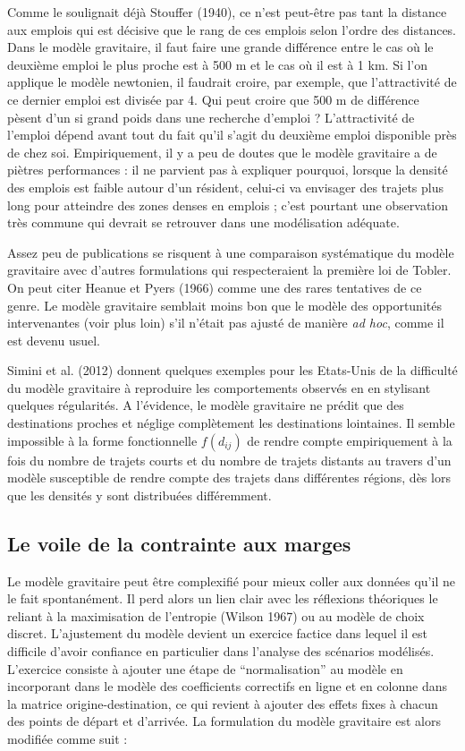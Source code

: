 \documentclass[
  10pt,
  a4paper,
  numbers=noendperiod,
  DIV=9]{scrreprt}
\begin{document}
Comme le soulignait déjà Stouffer (1940), ce n'est peut-être pas tant la
distance aux emplois qui est décisive que le rang de ces emplois selon
l'ordre des distances. Dans le modèle gravitaire, il faut faire une
grande différence entre le cas où le deuxième emploi le plus proche est
à 500 m et le cas où il est à 1 km. Si l'on applique le modèle
newtonien, il faudrait croire, par exemple, que l'attractivité de ce
dernier emploi est divisée par 4. Qui peut croire que 500 m de
différence pèsent d'un si grand poids dans une recherche d'emploi ?
L'attractivité de l'emploi dépend avant tout du fait qu'il s'agit du
deuxième emploi disponible près de chez soi. Empiriquement, il y a peu
de doutes que le modèle gravitaire a de piètres performances : il ne
parvient pas à expliquer pourquoi, lorsque la densité des emplois est
faible autour d'un résident, celui-ci va envisager des trajets plus long
pour atteindre des zones denses en emplois ; c'est pourtant une
observation très commune qui devrait se retrouver dans une modélisation
adéquate.

Assez peu de publications se risquent à une comparaison systématique du
modèle gravitaire avec d'autres formulations qui respecteraient la
première loi de Tobler. On peut citer Heanue et Pyers (1966) comme une
des rares tentatives de ce genre. Le modèle gravitaire semblait moins
bon que le modèle des opportunités intervenantes (voir plus loin) s'il
n'était pas ajusté de manière \emph{ad hoc}, comme il est devenu usuel.

Simini et al. (2012) donnent quelques exemples pour les Etats-Unis de la
difficulté du modèle gravitaire à reproduire les comportements observés
en en stylisant quelques régularités. A l'évidence, le modèle gravitaire
ne prédit que des destinations proches et néglige complètement les
destinations lointaines. Il semble impossible à la forme fonctionnelle
\(f(d_{ij})\) de rendre compte empiriquement à la fois du nombre de
trajets courts et du nombre de trajets distants au travers d'un modèle
susceptible de rendre compte des trajets dans différentes régions, dès
lors que les densités y sont distribuées différemment.

\hypertarget{le-voile-de-la-contrainte-aux-marges}{%
\subsection{Le voile de la contrainte aux
marges}\label{le-voile-de-la-contrainte-aux-marges}}

Le modèle gravitaire peut être complexifié pour mieux coller aux données
qu'il ne le fait spontanément. Il perd alors un lien clair avec les
réflexions théoriques le reliant à la maximisation de l'entropie (Wilson
1967) ou au modèle de choix discret. L'ajustement du modèle devient un
exercice factice dans lequel il est difficile d'avoir confiance en
particulier dans l'analyse des scénarios modélisés. L'exercice consiste
à ajouter une étape de ``normalisation'' au modèle en incorporant dans
le modèle des coefficients correctifs en ligne et en colonne dans la
matrice origine-destination, ce qui revient à ajouter des effets fixes à
chacun des points de départ et d'arrivée. La formulation du modèle
gravitaire est alors modifiée comme suit :
\end{document}
